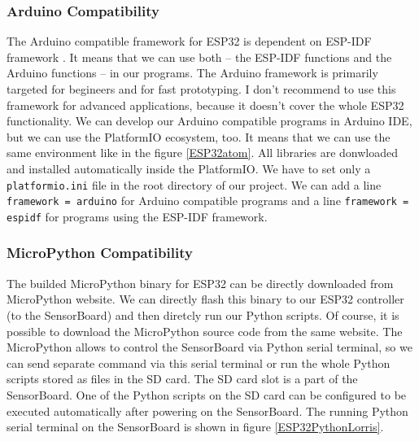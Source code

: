 \subsubsection{Arduino Compatibility}
The Arduino compatible framework for ESP32 \cite{espressif:ArduinoCore} is dependent on ESP-IDF framework \cite{espressif:ESP-IDF}. It means that we can use both -- the ESP-IDF functions and the Arduino functions -- in our programs. The Arduino framework is primarily targeted for begineers and for fast prototyping. I don't recommend to use this framework for advanced applications, because it doesn't cover the whole ESP32 functionality. We can develop our Arduino compatible programs in Arduino IDE, but we can use the PlatformIO ecosystem, too. It means that we can use the same environment like in the figure \ref{ESP32atom}. All libraries are donwloaded and installed automatically inside the PlatformIO. We have to set only a \texttt{platformio.ini} file in the root directory of our project. We can add a line \texttt{framework = arduino} for Arduino compatible programs and a line \texttt{framework = espidf} for programs using the ESP-IDF framework.

\subsubsection{MicroPython Compatibility}
The builded MicroPython binary for ESP32 can be directly downloaded from MicroPython website. \cite{MicroPython} We can directly flash this binary to our ESP32 controller (to the SensorBoard) and then diretcly run our Python scripts. Of course, it is possible to download the MicroPython source code from the same website. The MicroPython allows to control the SensorBoard via Python serial terminal, so we can send separate command via this serial terminal or run the whole Python scripts stored as files in the SD card. The SD card slot is a part of the SensorBoard. One of the Python scripts on the SD card can be configured to be executed automatically after powering on the SensorBoard. The running Python serial terminal on the SensorBoard is shown in figure \ref{ESP32PythonLorris}.


